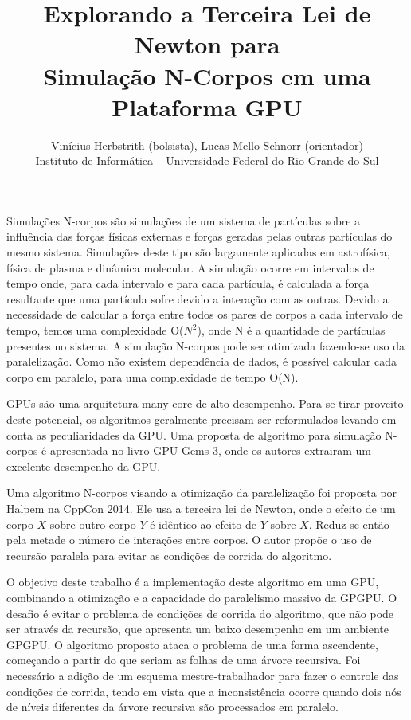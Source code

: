 \documentclass[12pt]{article}
\begin{document}
\title{Explorando a Terceira Lei de Newton para \\ Simulação N-Corpos em
  uma Plataforma GPU}

\author{Vinícius Herbstrith (bolsista), Lucas Mello Schnorr (orientador) \\
Instituto de Informática -- Universidade Federal do Rio Grande do Sul}
\date{}

\maketitle


Simulações N-corpos são simulações de um sistema de partículas sobre a
influência das forças físicas externas e forças geradas pelas outras
partículas do mesmo sistema. Simulações deste tipo são largamente
aplicadas em astrofísica, física de plasma e dinâmica molecular.  A
simulação ocorre em intervalos de tempo onde, para cada intervalo e
para cada partícula, é calculada a força resultante que uma partícula
sofre devido a interação com as outras. Devido a necessidade de
calcular a força entre todos os pares de corpos a cada intervalo de
tempo, temos uma complexidade O($N^2$), onde N é a quantidade de
partículas presentes no sistema.
%
A simulação N-corpos pode ser otimizada fazendo-se uso da
paralelização. Como não existem dependência de dados, é possível
calcular cada corpo em paralelo, para uma complexidade de tempo O(N).

GPUs são uma arquitetura many-core de alto desempenho. Para se tirar
proveito deste potencial, os algoritmos geralmente precisam ser
reformulados levando em conta as peculiaridades da GPU. Uma proposta
de algoritmo para simulação N-corpos é apresentada no livro GPU Gems 3,
onde os autores extrairam um excelente desempenho da GPU.

Uma algoritmo N-corpos visando a otimização da paralelização foi
proposta por Halpem na CppCon 2014. Ele usa a terceira lei de Newton,
onde o efeito de um corpo $X$ sobre outro corpo $Y$ é idêntico ao
efeito de $Y$ sobre $X$.  Reduz-se então pela metade o número de
interações entre corpos.  O autor propõe o uso de recursão paralela
para evitar as condições de corrida do algoritmo.

O objetivo deste trabalho é a implementação deste algoritmo em uma
GPU, combinando a otimização e a capacidade do paralelismo massivo da
GPGPU. O desafio é evitar o problema de condições de corrida do
algoritmo, que não pode ser através da recursão, que apresenta um
baixo desempenho em um ambiente GPGPU. O algoritmo proposto ataca o
problema de uma forma ascendente, começando a partir do que seriam as
folhas de uma árvore recursiva. Foi necessário a adição de um esquema
mestre-trabalhador para fazer o controle das condições de corrida, tendo
em vista que a inconsistência ocorre quando dois nós de níveis
diferentes da árvore recursiva são processados em paralelo.
\end{document}
